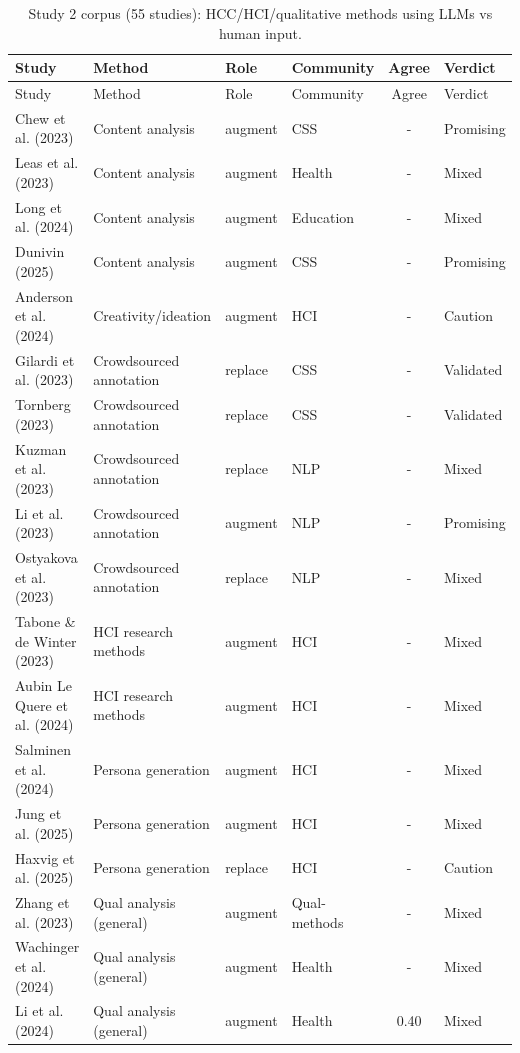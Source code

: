 \footnotesize
\begin{longtable}{@{}l l l l c l@{}}
\caption{Study 2 corpus (55 studies): HCC/HCI/qualitative methods using LLMs vs human input.}\label{tab:study2full}\\
\toprule
Study & Method & Role & Community & Agree & Verdict \\
\midrule
\endfirsthead
\toprule Study & Method & Role & Community & Agree & Verdict \\ \midrule \endhead
Chew et al. (2023) & Content analysis & augment & CSS & - & Promising \\
Leas et al. (2023) & Content analysis & augment & Health & - & Mixed \\
Long et al. (2024) & Content analysis & augment & Education & - & Mixed \\
Dunivin (2025) & Content analysis & augment & CSS & - & Promising \\
Anderson et al. (2024) & Creativity/ideation & augment & HCI & - & Caution \\
Gilardi et al. (2023) & Crowdsourced annotation & replace & CSS & - & Validated \\
Tornberg (2023) & Crowdsourced annotation & replace & CSS & - & Validated \\
Kuzman et al. (2023) & Crowdsourced annotation & replace & NLP & - & Mixed \\
Li et al. (2023) & Crowdsourced annotation & augment & NLP & - & Promising \\
Ostyakova et al. (2023) & Crowdsourced annotation & replace & NLP & - & Mixed \\
Tabone \& de Winter (2023) & HCI research methods & augment & HCI & - & Mixed \\
Aubin Le Quere et al. (2024) & HCI research methods & augment & HCI & - & Mixed \\
Salminen et al. (2024) & Persona generation & augment & HCI & - & Mixed \\
Jung et al. (2025) & Persona generation & augment & HCI & - & Mixed \\
Haxvig et al. (2025) & Persona generation & replace & HCI & - & Caution \\
Zhang et al. (2023) & Qual analysis (general) & augment & Qual-methods & - & Mixed \\
Wachinger et al. (2024) & Qual analysis (general) & augment & Health & - & Mixed \\
Li et al. (2024) & Qual analysis (general) & augment & Health & 0.40 & Mixed \\

\end{longtable}
